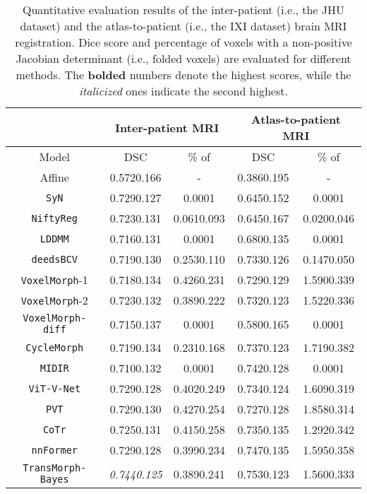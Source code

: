 \documentclass[times,twocolumn,final]{elsarticle}
\begin{document}
\begin{table*}[!t]
\fontsize{6.5}{8}\selectfont
\parbox{.5\linewidth}{
\centering
\caption{Quantitative evaluation results of the inter-patient (i.e., the JHU dataset) and the atlas-to-patient (i.e., the IXI dataset) brain MRI registration. Dice score and percentage of voxels with a non-positive Jacobian determinant (i.e., folded voxels) are evaluated for different methods. The \textbf{bolded} numbers denote the highest scores, while the \textit{italicized} ones indicate the second highest.}
\begin{tabular}{ c | c | c | c | c}
\hline
  & \multicolumn{2}{c|}{Inter-patient MRI} & \multicolumn{2}{c}{Atlas-to-patient MRI} \\
 \hline
 Model & DSC & \% of  & DSC & \% of \\
 \hline
 Affine & 0.5720.166 & - & 0.3860.195 & -\\
 \hline
 \texttt{SyN}& 0.7290.127 & 0.0001& 0.6450.152 & 0.0001\\
 \hline
 \texttt{NiftyReg}& 0.7230.131 & 0.0610.093& 0.6450.167 & 0.0200.046\\
 \hline
 \texttt{LDDMM} & 0.7160.131 & 0.0001& 0.6800.135 & 0.0001\\
 \hline
 \texttt{deedsBCV}& 0.7190.130 & 0.2530.110& 0.7330.126 & 0.1470.050\\
 \hline
 \texttt{VoxelMorph}-1 & 0.7180.134 & 0.4260.231& 0.7290.129 & 1.5900.339\\
 \hline
 \texttt{VoxelMorph}-2 & 0.7230.132 & 0.3890.222& 0.7320.123 & 1.5220.336\\
 \hline
 \texttt{VoxelMorph-diff} & 0.7150.137 & 0.0001& 0.5800.165 & 0.0001\\
 \hline
 \texttt{CycleMorph} & 0.7190.134 & 0.2310.168& 0.7370.123 & 1.7190.382\\
 \hline
 \texttt{MIDIR} & 0.7100.132 & 0.0001& 0.7420.128 & 0.0001\\
 \hline
 \texttt{ViT-V-Net} & 0.7290.128 & 0.4020.249& 0.7340.124& 1.6090.319\\
 \hline
 \texttt{PVT} & 0.7290.130 & 0.4270.254& 0.7270.128& 1.8580.314\\
 \hline
 \texttt{CoTr} & 0.7250.131 & 0.4150.258& 0.7350.135& 1.2920.342\\
  \hline
 \texttt{nnFormer} & 0.7290.128 & 0.3990.234& 0.7470.135& 1.5950.358\\
 \hline
 \hline
 \texttt{TransMorph-Bayes} & \textit{0.7440.125} & 0.3890.241& 0.7530.123& 1.5600.333\\
 \hline

\end{tabular}}
\end{table*}
\end{document}
